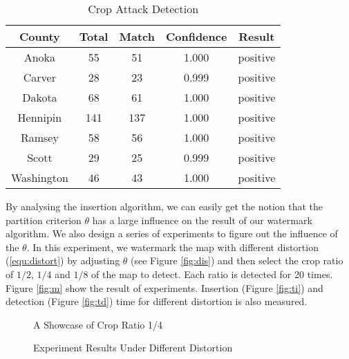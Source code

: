 \begin{table}[ht]
\centering
\caption{Crop Attack Detection}
\label{tab:crop}
\begin{tabular}{|c||c|c|c|c|} 
\hline
County & Total & Match & Confidence & Result \\\hline \hline
Anoka & 55 & 51 & 1.000 & positive\\\hline
Carver & 28 & 23 & 0.999 & positive\\\hline
Dakota & 68 & 61 & 1.000 & positive\\\hline
Hennipin & 141 & 137 & 1.000 & positive\\\hline
Ramsey & 58 & 56 & 1.000 & positive\\\hline
Scott & 29 & 25 & 0.999 & positive\\\hline
Washington & 46 & 43 & 1.000 & positive\\\hline
\end{tabular}
\end{table}

By analysing the insertion algorithm, we can easily get the notion that the 
partition criterion $\theta $ has a large influence on the result of our watermark 
algorithm. We also design a series of experiments to figure out the influence 
of the $\theta $. In this experiment, we watermark the map with different distortion 
(\ref{equ:distort}) by adjusting $\theta $ (see Figure \ref{fig:dis}) and then select 
the crop ratio of $1/2$, $1/4$ and $1/8$ of the map to detect. Each ratio is detected 
for 20 times.  Figure \ref{fig:m} show the result of experiments. 
Insertion (Figure \ref{fig:ti}) and detection (Figure \ref{fig:td}) time 
for different distortion is also measured.

\begin{figure}[th]
\centering
{}
\caption{A Showcase of Crop Ratio 1/4}
\label{fig:cropmethod}
\end{figure}



\begin{figure}[th]
\centering
{}
\caption{Experiment Results Under Different Distortion}
\label{fig:pudd}
\end{figure}

